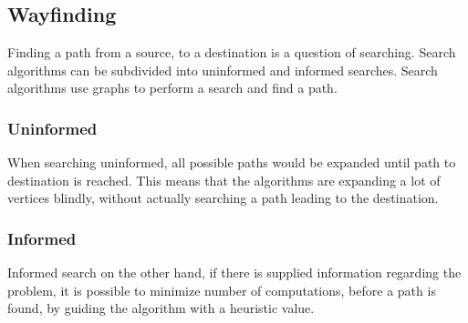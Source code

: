 
\subsection{Wayfinding}\label{sub:way}

Finding a path from a source, to a destination is a question of searching. Search algorithms can be subdivided into uninformed and informed searches. Search algorithms use graphs to perform a search and find a path.

\subsubsection{Uninformed}

When searching uninformed, all possible paths would be expanded until path to destination is reached. This means that the algorithms are expanding a lot of vertices blindly, without actually searching a path leading to the destination.

\subsubsection{Informed}

Informed search on the other hand, if there is supplied information regarding the problem, it is possible to minimize number of computations, before a path is found, by guiding the algorithm with a heuristic value.